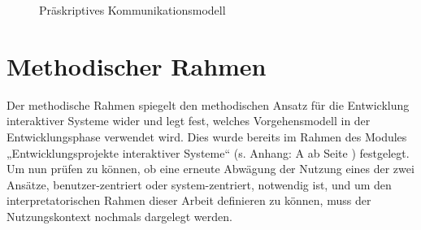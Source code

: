 \documentclass[a4paper,11pt]{article}%
\renewcommand{\\}{\vspace*{0.5\baselineskip} \newline}
\begin{document}
\begin{figure}[H]
	\centering
	\setlength{\fboxsep}{1pt}
	\setlength{\fboxrule}{1pt}
	\captionsetup{justification=centering}
	\caption{Präskriptives Kommunikationsmodell}
	\label{img:präskriptiv}
\end{figure}


\newpage

\section{Methodischer Rahmen}
	Der methodische Rahmen spiegelt den methodischen Ansatz für die Entwicklung interaktiver Systeme wider und legt fest, welches Vorgehensmodell in der Entwicklungsphase verwendet wird. Dies wurde bereits im Rahmen des Modules „Entwicklungsprojekte interaktiver Systeme“ (s. Anhang: A  ab Seite \pageref{section:Rahmen}) festgelegt. Um nun prüfen zu können, ob eine erneute Abwägung der Nutzung eines der zwei Ansätze, benutzer-zentriert oder system-zentriert, notwendig ist, und um den interpretatorischen Rahmen dieser Arbeit definieren zu können, muss der Nutzungskontext nochmals dargelegt werden. 
\end{document}
